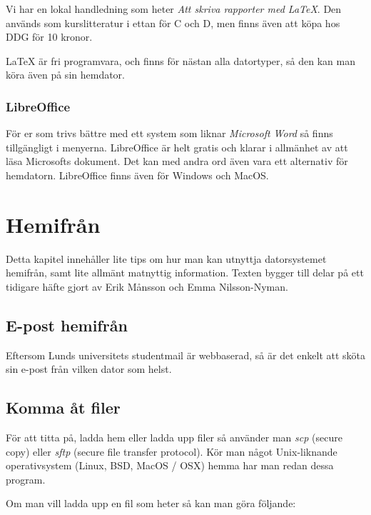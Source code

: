 \documentclass[a4paper,twocolumn]{book}
\begin{document}
Vi har en lokal handledning som heter \emph{Att skriva rapporter med
\LaTeX}. Den används som kurslitteratur i ettan för C och D, men finns även 
att köpa hos DDG för 10 kronor.

\LaTeX{} är fri programvara, och finns för nästan alla datortyper, så
den kan man köra även på sin hemdator.

\subsection{LibreOffice}

För er som trivs bättre med ett system som liknar \emph{Microsoft Word}
så finns  tillgängligt i menyerna. LibreOffice är helt
gratis och klarar i allmänhet av att läsa Microsofts dokument. Det kan med
andra ord även vara ett alternativ för hemdatorn. LibreOffice finns även för
Windows och MacOS.


\chapter{Hemifrån}
\label{cha:hemifran}

Detta kapitel innehåller lite tips om hur man kan utnyttja datorsystemet
hemifrån, samt lite allmänt matnyttig information. Texten bygger till 
delar på ett tidigare häfte gjort av Erik Månsson och Emma Nilsson-Nyman.

\section{E-post hemifrån}

Eftersom Lunds universitets studentmail är webbaserad, så är det enkelt att
sköta sin e-post från vilken dator som helst.


\section{Komma åt filer}

För att titta på, ladda hem eller ladda upp filer så använder man \emph{scp}
(secure copy) eller \emph{sftp} (secure file transfer protocol). Kör man något
Unix-liknande operativsystem (Linux, BSD, MacOS / OSX) hemma har man redan dessa
program. 

Om man vill ladda upp en fil som heter  så kan man göra följande:
\end{document}
